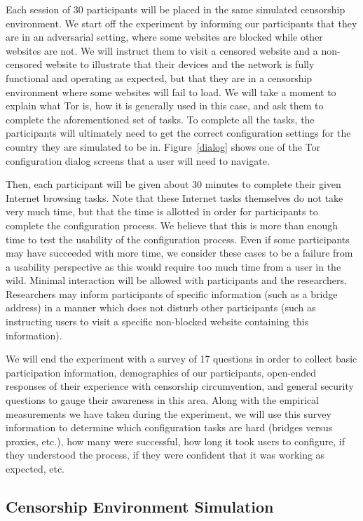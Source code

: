 \documentclass[letterpaper,twocolumn,11pt]{article}
\begin{document}
Each session of 30 participants will be placed in the same simulated censorship environment. 
We start off the experiment by informing our participants that they are in an adversarial setting, 
where some websites are blocked while other websites are not. We will instruct them to visit a censored
website and a non-censored website to illustrate that their devices and the network is fully functional and
operating as expected, but that they are in a censorship environment where some websites will fail to load. 
We will take a moment to explain what Tor is, how it is generally used in this case, and ask them to complete 
the aforementioned set of tasks. To complete all the tasks, the participants will ultimately need to get the correct
configuration settings for the country they are simulated to be in.  Figure~\ref{dialog} shows one of the 
Tor configuration dialog screens that a user will need to navigate. 

Then, each participant will be given about 30 minutes to complete their given Internet browsing tasks. 
Note that these Internet tasks themselves do not take very much time, but that the time is allotted in order
for participants to complete the configuration process. We believe that this is more than enough time to 
test the usability of the configuration process. Even if some participants may have succeeded with more 
time, we consider these cases to be a failure from a usability perspective as this would require too much
time from a user in the wild. Minimal interaction will be allowed with participants and the researchers. 
Researchers may inform participants of specific information (such as a bridge address) in a manner 
which does not disturb other participants (such as instructing users to visit a specific non-blocked website 
containing this information). 

We will end the experiment with a survey of 17 questions in order to collect basic participation information, 
demographics of our participants, open-ended responses of their experience with censorship circumvention,
and general security questions to gauge their awareness in this area. Along with the empirical measurements 
we have taken during the experiment, we will use this survey information to determine which configuration tasks are hard (bridges versus proxies, etc.), how many were successful, how long it took users to configure, if they understood the process, if they were confident that it was working as expected, etc.  

\subsection{Censorship Environment Simulation}
\end{document}
